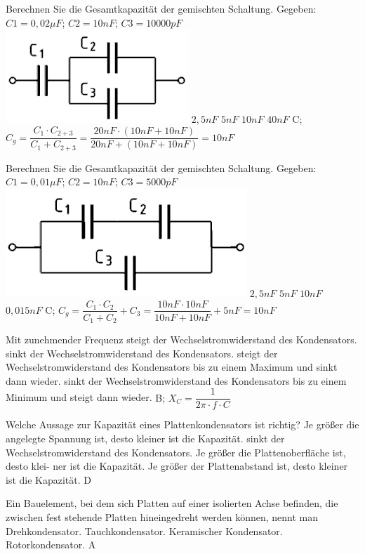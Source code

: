 {
Berechnen Sie die Gesamtkapazität der gemischten Schaltung. Gegeben: $C1 = 0,02\mu F$; $C2 = 10nF$; $C3 = 10000pF $ \\
\includegraphics[scale=0.35]{Kondensator/Bilder/TD106.png}
}%
{$2,5nF$}%
{$5nF$}%
{$10nF$}%
{$40nF$}%
{C; $C_g = \dfrac{C_1 \cdot C_{2+3}}{C_1 + C_{2+3}} = \dfrac{20nF \cdot (10nF + 10nF)}{20nF + (10nF + 10nF)} = 10nF$}%

{
Berechnen Sie die Gesamtkapazität der gemischten Schaltung. Gegeben: $C1 = 0,01 \mu F$; $C2 = 10 nF$; $C3 = 5000 pF$\\
\includegraphics[scale=0.3]{Kondensator/Bilder/TD107.png}
}%
{$2,5 nF$}%
{$5 nF$}%
{$10 nF$}%
{$0,015 nF$}%
{C; $C_g = \dfrac{C_1 \cdot C_2}{C_1 + C_2} + C_3 = \dfrac{10nF \cdot 10nF}{10nF + 10nF} + 5nF = 10nF$}%

{Mit zunehmender Frequenz}%
{steigt der Wechselstromwiderstand des Kondensators.}%
{sinkt der Wechselstromwiderstand des Kondensators.}%
{steigt der Wechselstromwiderstand des Kondensators bis zu einem Maximum und sinkt dann wieder.}%
{sinkt der Wechselstromwiderstand des Kondensators bis zu einem Minimum und steigt dann wieder.}%
{B; $X_C = \dfrac{1}{2\pi \cdot f \cdot C}$}%


{Welche Aussage zur Kapazität eines Plattenkondensators ist richtig?}%
{Je größer die angelegte Spannung ist, desto
kleiner ist die Kapazität.}%
{sinkt der Wechselstromwiderstand des Kondensators.}%
{Je größer die Plattenoberfläche ist, desto klei-
ner ist die Kapazität.}%
{Je größer der Plattenabstand ist, desto kleiner
ist die Kapazität.}%
{D}%

{Ein Bauelement, bei dem sich Platten auf einer isolierten Achse befinden, die zwischen fest stehende Platten hineingedreht werden können, nennt man}%
{Drehkondensator.}%
{Tauchkondensator.}%
{Keramischer Kondensator.}%
{Rotorkondensator.}%
{A}%


